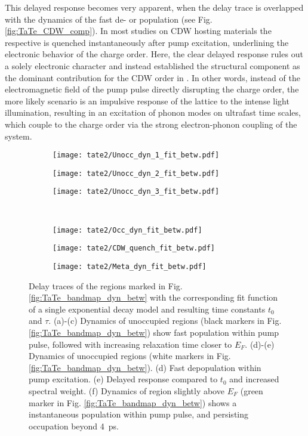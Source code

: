 This delayed response becomes very apparent, when the delay trace is overlapped with the dynamics of the fast de- or population (see Fig. \ref{fig:TaTe_CDW_comp}).
In most studies on CDW hosting materials the respective is quenched instantaneously after pump excitation, underlining the electronic behavior of the charge order.
Here, the clear delayed response rules out a solely electronic character and instead established the structural component as the dominant contribution for the CDW order in .
In other words, instead of the electromagnetic field of the pump pulse directly disrupting the charge order, the more likely scenario is an impulsive response of the lattice to the intense light illumination, resulting in an excitation of phonon modes on ultrafast time scales, which couple to the charge order via the strong electron-phonon coupling of the system.

\begin{figure}[t]
	\centering
	\begin{subfigure}[b]{0.33\textwidth}
		\texttt{[image: tate2/Unocc\_dyn\_1\_fit\_betw.pdf]}
		\caption{}
	\end{subfigure}
	\hfill
	\begin{subfigure}[b]{0.33\textwidth}
		\texttt{[image: tate2/Unocc\_dyn\_2\_fit\_betw.pdf]}
		\caption{}
	\end{subfigure}
	\hfill
	\begin{subfigure}[b]{0.33\textwidth}
		\texttt{[image: tate2/Unocc\_dyn\_3\_fit\_betw.pdf]}
		\caption{}
	\end{subfigure}
	\\
	\begin{subfigure}[b]{0.33\textwidth}
		\texttt{[image: tate2/Occ\_dyn\_fit\_betw.pdf]}
		\caption{}
	\end{subfigure}
	\hfill
	\begin{subfigure}[b]{0.33\textwidth}
		\texttt{[image: tate2/CDW\_quench\_fit\_betw.pdf]}
		\caption{}
	\end{subfigure}
	\hfill
	\begin{subfigure}[b]{0.33\textwidth}
		\texttt{[image: tate2/Meta\_dyn\_fit\_betw.pdf]}
		\caption{}
	\end{subfigure}
	\caption{Delay traces of the regions marked in Fig. \ref{fig:TaTe_bandmap_dyn_betw} with the corresponding fit function of a single exponential decay model and resulting time constants $t_0$ and $\tau$. (a)-(c) Dynamics of unoccupied regions (black markers in Fig. \ref{fig:TaTe_bandmap_dyn_betw}) show fast population within pump pulse, followed with increasing relaxation time closer to $E_F$. (d)-(e) Dynamics of unoccupied regions (white markers in Fig. \ref{fig:TaTe_bandmap_dyn_betw}). (d) Fast depopulation within pump excitation. (e) Delayed response compared to $t_0$ and increased spectral weight. (f) Dynamics of region slightly above $E_F$ (green marker in Fig. \ref{fig:TaTe_bandmap_dyn_betw}) shows a instantaneous population within pump pulse, and persisting occupation beyond \SI{4}{\pico\second}.}
	\label{fig:TaTe_dyn_betw}
\end{figure}


